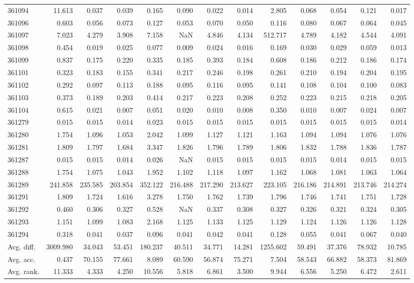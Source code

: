\begin{tabular}{lrrrrrrrrrrrr}
361094 & 11.613 & 0.037 & 0.039 & 0.165 & 0.090 & 0.022 & 0.014 & 2.805 & 0.068 & 0.054 & 0.121 & 0.017 \\
361096 & 0.603 & 0.056 & 0.073 & 0.127 & 0.053 & 0.070 & 0.050 & 0.116 & 0.080 & 0.067 & 0.064 & 0.045 \\
361097 & 7.023 & 4.279 & 3.908 & 7.158 & NaN & 4.846 & 4.134 & 512.717 & 4.789 & 4.182 & 4.544 & 4.091 \\
361098 & 0.454 & 0.019 & 0.025 & 0.077 & 0.009 & 0.024 & 0.016 & 0.169 & 0.030 & 0.029 & 0.059 & 0.013 \\
361099 & 0.837 & 0.175 & 0.220 & 0.335 & 0.185 & 0.393 & 0.184 & 0.608 & 0.186 & 0.212 & 0.186 & 0.174 \\
361101 & 0.323 & 0.183 & 0.155 & 0.341 & 0.217 & 0.246 & 0.198 & 0.261 & 0.210 & 0.194 & 0.204 & 0.195 \\
361102 & 0.292 & 0.097 & 0.113 & 0.188 & 0.095 & 0.116 & 0.095 & 0.141 & 0.108 & 0.104 & 0.100 & 0.083 \\
361103 & 0.373 & 0.189 & 0.203 & 0.414 & 0.217 & 0.223 & 0.208 & 0.252 & 0.223 & 0.215 & 0.218 & 0.205 \\
361104 & 0.615 & 0.021 & 0.007 & 0.051 & 0.020 & 0.010 & 0.008 & 0.350 & 0.010 & 0.007 & 0.024 & 0.007 \\
361279 & 0.015 & 0.015 & 0.014 & 0.023 & 0.015 & 0.015 & 0.015 & 0.015 & 0.015 & 0.015 & 0.015 & 0.014 \\
361280 & 1.754 & 1.096 & 1.053 & 2.042 & 1.099 & 1.127 & 1.121 & 1.163 & 1.094 & 1.094 & 1.076 & 1.076 \\
361281 & 1.809 & 1.797 & 1.684 & 3.347 & 1.826 & 1.796 & 1.789 & 1.806 & 1.832 & 1.788 & 1.836 & 1.787 \\
361287 & 0.015 & 0.015 & 0.014 & 0.026 & NaN & 0.015 & 0.015 & 0.015 & 0.015 & 0.014 & 0.015 & 0.015 \\
361288 & 1.754 & 1.075 & 1.043 & 1.952 & 1.102 & 1.118 & 1.097 & 1.162 & 1.068 & 1.081 & 1.063 & 1.064 \\
361289 & 241.858 & 235.585 & 203.854 & 352.122 & 216.488 & 217.290 & 213.627 & 223.105 & 216.186 & 214.891 & 213.746 & 214.274 \\
361291 & 1.809 & 1.724 & 1.616 & 3.278 & 1.750 & 1.762 & 1.739 & 1.796 & 1.746 & 1.741 & 1.751 & 1.728 \\
361292 & 0.460 & 0.306 & 0.327 & 0.528 & NaN & 0.337 & 0.308 & 0.327 & 0.326 & 0.321 & 0.324 & 0.305 \\
361293 & 1.151 & 1.099 & 1.083 & 2.168 & 1.125 & 1.133 & 1.125 & 1.129 & 1.124 & 1.126 & 1.126 & 1.128 \\
361294 & 0.318 & 0.041 & 0.037 & 0.096 & 0.041 & 0.042 & 0.041 & 0.128 & 0.055 & 0.041 & 0.067 & 0.040 \\
Avg. diff. & 3009.980 & 34.043 & 53.451 & 180.237 & 40.511 & 34.771 & 14.281 & 1255.602 & 59.491 & 37.376 & 78.932 & 10.785 \\
Avg. acc. & 0.437 & 70.155 & 77.661 & 8.089 & 60.590 & 56.874 & 75.271 & 7.504 & 58.543 & 66.882 & 58.373 & 81.869 \\
Avg. rank. & 11.333 & 4.333 & 4.250 & 10.556 & 5.818 & 6.861 & 3.500 & 9.944 & 6.556 & 5.250 & 6.472 & 2.611 \\
\bottomrule
\end{tabular}
